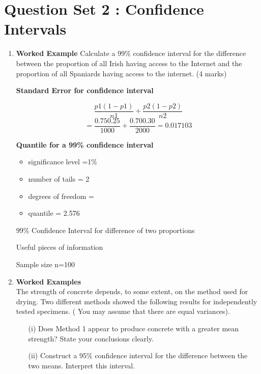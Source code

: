 \documentclass[]{report}
\begin{document}
\section*{Question Set 2 : Confidence Intervals}
\begin{enumerate}
	
	\item \textbf{Worked Example}
	Calculate a 99\% confidence interval for the difference between the proportion of all Irish having access to the
	Internet and the proportion of all Spaniards having access to the internet.  (4 marks)
	
	
	
	\noindent \textbf{Standard Error for confidence interval}	
	
	\[\frac{p1(1 -p1)}{n1}+ \frac{p2(1 -p2)}{n2}\]	
	\[=\frac{0.750.25}{1000}+ \frac{0.700.30}{2000}     =  0.017103\]
	
	\noindent \textbf{Quantile for a 99\% confidence interval}
	\begin{itemize}
		\item 	significance level  =1\%
		\item	number of tails = 2
		\item	degrees of freedom = 
		\item	quantile = 2.576 
	\end{itemize}
	
	
	
	99\% Confidence Interval for difference of two proportions
	
	
	
	Useful pieces of information
	
	
	Sample size  n=100
	
	
	\item \textbf{Worked Examples} \\
	
	The strength of concrete depends, to some extent, on the method used for drying. Two different methods showed the following results for independently tested specimens.  ( You may assume that there are equal variances).
	
	
	\begin{itemize}
		\item[(i)] Does Method 1 appear to produce concrete with a greater mean strength? State your conclusions clearly.
		\item[(ii)] Construct a 95\% confidence interval for the difference between the two means. Interpret this interval.
		

\end{itemize}
\end{enumerate}
\end{document}
